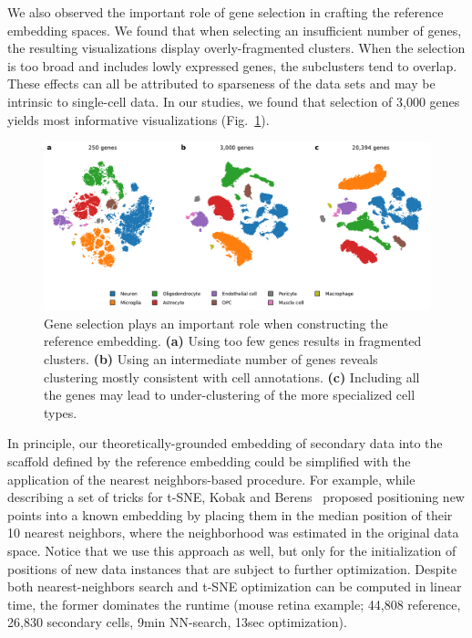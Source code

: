 \documentclass[runningheads]{llncs}
\begin{document}
We also observed the important role of gene selection in crafting the reference
embedding spaces. We found that when selecting an insufficient number of genes,
the resulting visualizations display overly-fragmented clusters. When the
selection is too broad and includes lowly expressed genes, the subclusters tend
to overlap. These effects can all be attributed to sparseness of the data sets
and may be intrinsic to single-cell data. In our studies, we found that
selection of 3,000 genes yields most informative visualizations
(Fig.~\ref{fig:gene_selection}).

\begin{figure}[htbp]
  \includegraphics[width=\textwidth]{hrvatin_embedding_tsne_genes.pdf}
  \caption{Gene selection plays an important role when constructing the
  reference embedding. {\bf (a)} Using too few genes results in fragmented
  clusters. {\bf (b)} Using an intermediate number of genes reveals clustering
  mostly consistent with cell annotations. {\bf (c)} Including all the genes
  may lead to under-clustering of the more specialized cell types.}
  \label{fig:gene_selection}
\end{figure}

In principle, our theoretically-grounded embedding of secondary data into the
scaffold defined by the reference embedding could be simplified with the
application of the nearest neighbors-based procedure. For example, while
describing a set of tricks for t-SNE, Kobak and Berens~\cite{Kobak2019}
proposed positioning new points into a known embedding by placing them in the
median position of their 10 nearest neighbors, where the neighborhood was
estimated in the original data space. Notice that we use this approach as well,
but only for the initialization of positions of new data instances that are
subject to further optimization. Despite both nearest-neighbors search and
t-SNE optimization can be computed in linear time, the former dominates the
runtime (mouse retina example; 44,808 reference, 26,830 secondary cells,
9min NN-search, 13sec optimization).
\end{document}
